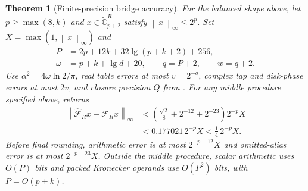 \documentclass[11pt]{article}
\newtheorem{theorem}{Theorem}[section]
\theoremstyle{definition}
\renewcommand{\label}[1]{}%
\newcommand{\Cg}{\widetilde{\mathbb{C}}}
\newcommand{\cF}{\mathcal{F}}
\newcommand{\norm}[1]{\left\lVert #1 \right\rVert}
\begin{document}
\begin{theorem}[Finite-precision bridge accuracy]\label{thm:bridge-acc}
For the balanced shape above, let $p\ge\max(8,k)$ and
$x\in\Cg_{p+2}^R$ satisfy $\norm{x}_\infty\le2^p$.
Set $X=\max(1,\norm{x}_\infty)$ and
\begin{equation}\label{eq:bridge-sched}
 \begin{aligned}
 P&=2p+12k+32\lg(p+k+2)+256,\\
 \omega&=p+k+\lg d+20,\qquad q=P+2,\qquad w=q+2.
 \end{aligned}
\end{equation}
Use $\alpha^2=4\omega\ln2/\pi$, real table errors at most $v=2^{-q}$,
complex tap and disk-phase errors at most $2v$, and closure precision $Q$
from .
For any middle procedure specified above,  returns
\begin{equation}\label{eq:bridge-bound}
 \begin{aligned}
 \norm{\widehat{\cF}_Rx-\cF_Rx}_\infty
 &<\left(\frac{\sqrt2}{8}+2^{-12}+2^{-23}\right)2^{-p}X\\
 &<0.177021\,2^{-p}X<\frac14\,2^{-p}X.
 \end{aligned}
\end{equation}
Before final rounding, arithmetic error is at most $2^{-p-12}X$
and omitted-alias error is at most $2^{-p-23}X$.
Outside the middle procedure, scalar arithmetic uses $O(P)$ bits and
packed Kronecker operands use $O(P^2)$ bits, with $P=O(p+k)$.
\end{theorem}
\end{document}
